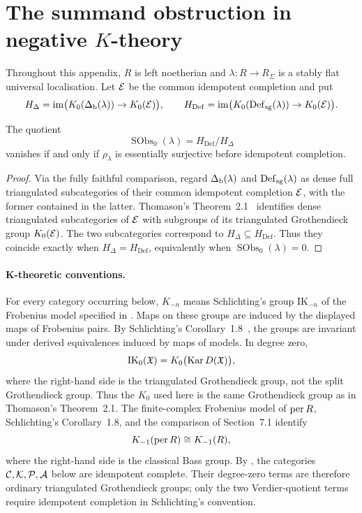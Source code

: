 \section{The summand obstruction in negative \texorpdfstring{\(K\)}{K}-theory}\label{app:negative-k}\label{subsec:summand-negative-k}
Throughout this appendix, \(R\) is left noetherian and \(\lambda:R\to R_\Sigma\) is a stably flat universal localisation. Let \(\mathcal E\) be the common idempotent completion and put
\[
 H_\Delta=\operatorname{im}\bigl(K_0(\Delta_{\mathrm b}(\lambda))\to K_0(\mathcal E)\bigr),\qquad
 H_{\mathrm{Def}}=\operatorname{im}\bigl(K_0(\operatorname{Def}_{\mathrm{sg}}(\lambda))\to K_0(\mathcal E)\bigr).
\]

\begin{proposition}\label{prop:k0-obstruction}
The quotient
\[
 \operatorname{SObs}_0(\lambda)=H_{\mathrm{Def}}/H_\Delta
\]
vanishes if and only if \(\rho_\lambda\) is essentially surjective before idempotent completion.
\end{proposition}

\begin{proof}
Via the fully faithful comparison, regard \(\Delta_{\mathrm b}(\lambda)\) and \(\operatorname{Def}_{\mathrm{sg}}(\lambda)\) as dense full triangulated subcategories of their common idempotent completion \(\mathcal E\), with the former contained in the latter.  Thomason's Theorem~2.1~\cite{Thomason97} identifies dense triangulated subcategories of \(\mathcal E\) with subgroups of its triangulated Grothendieck group \(K_0(\mathcal E)\).  The two subcategories correspond to \(H_\Delta\subseteq H_{\mathrm{Def}}\).  Thus they coincide exactly when \(H_\Delta=H_{\mathrm{Def}}\), equivalently when \(\operatorname{SObs}_0(\lambda)=0\).
\end{proof}

\paragraph{K-theoretic conventions.}
For every category occurring below, \(K_{-n}\) means Schlichting's group \(\mathrm{IK}_{-n}\) of the Frobenius model specified in .  Maps on these groups are induced by the displayed maps of Frobenius pairs.  By Schlichting's Corollary~1.8~\cite{Schlichting06}, the groups are invariant under derived equivalences induced by maps of models.  In degree zero,
\[
 \mathrm{IK}_0(\mathfrak X)=K_0\bigl(\operatorname{Kar} D(\mathfrak X)\bigr),
\]
where the right-hand side is the triangulated Grothendieck group, not the split Grothendieck group.  Thus the \(K_0\) used here is the same Grothendieck group as in Thomason's Theorem~2.1.  The finite-complex Frobenius model of \(\operatorname{per} R\), Schlichting's Corollary~1.8, and the comparison of Section~7.1 identify
\[
 K_{-1}(\operatorname{per} R)\cong K_{-1}(R),
\]
where the right-hand side is the classical Bass group.  By , the categories \(\mathcal C,\mathcal K,\mathcal P,\mathcal A\) below are idempotent complete.  Their degree-zero terms are therefore ordinary triangulated Grothendieck groups; only the two Verdier-quotient terms require idempotent completion in Schlichting's convention.


